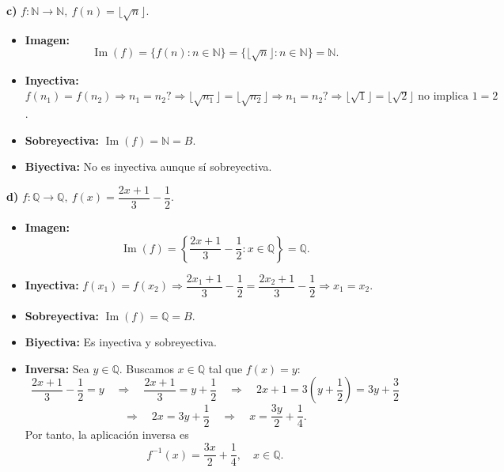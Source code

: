 \documentclass[a4paper,12pt]{article}
\begin{document}
\begin{ejercicio}[title=Ejercicio 19]

\textbf{c) } $f:\mathbb{N}\to\mathbb{N},\ f(n)=\lfloor \sqrt{n} \rfloor$.

\begin{itemize}
  \item \textbf{Imagen:} 
  \[
    \operatorname{Im}(f) = \{f(n) : n \in \mathbb{N}\} = \{\lfloor \sqrt{n} \rfloor : n \in \mathbb{N}\} = \boxed{\mathbb{N}}.
  \]
  \item \textbf{Inyectiva:} $f(n_1) = f(n_2) \Rightarrow n_1 = n_2? \Rightarrow \lfloor \sqrt{n_1} \rfloor = \lfloor \sqrt{n_2} \rfloor \Rightarrow n_1 = n_2? \Rightarrow \lfloor \sqrt{1} \rfloor = \lfloor \sqrt{2} \rfloor \text{ no implica } 1 = 2$. 
  \item \textbf{Sobreyectiva:} $\operatorname{Im}(f) = \mathbb{N} = B$. 
  \item \textbf{Biyectiva:} No es inyectiva aunque sí sobreyectiva. 
\end{itemize}

\textbf{d) } $f:\mathbb{Q}\to\mathbb{Q},\ f(x)=\dfrac{2x+1}{3}-\dfrac{1}{2}$.

\begin{itemize}
  \item \textbf{Imagen:} 
  \[
    \operatorname{Im}(f) = \left\{ \frac{2x+1}{3} - \frac{1}{2} : x \in \mathbb{Q} \right\} = \boxed{\mathbb{Q}}.
  \]
  \item \textbf{Inyectiva:} $f(x_1) = f(x_2) \Rightarrow \dfrac{2x_1+1}{3} - \dfrac{1}{2} = \dfrac{2x_2+1}{3} - \dfrac{1}{2} \Rightarrow x_1 = x_2$. 
  \item \textbf{Sobreyectiva:} $\operatorname{Im}(f) = \mathbb{Q} = B$. 
  \item \textbf{Biyectiva:} Es inyectiva y sobreyectiva. 
  \item \textbf{Inversa:}  
Sea $y \in \mathbb{Q}$. Buscamos $x \in \mathbb{Q}$ tal que $f(x) = y$:  
\[
\frac{2x+1}{3} - \frac{1}{2} = y \quad \Rightarrow \quad \frac{2x+1}{3} = y + \frac{1}{2} \quad \Rightarrow \quad 2x+1 = 3\left(y + \frac{1}{2}\right) = 3y + \frac{3}{2} \]
\[\Rightarrow \quad 2x = 3y + \frac{1}{2} \quad \Rightarrow \quad x = \frac{3y}{2} + \frac{1}{4}.
\]  
Por tanto, la aplicación inversa es  
\[
\boxed{f^{-1}(x) = \frac{3x}{2} + \frac{1}{4}, \quad x \in \mathbb{Q}}.
\]
\end{itemize}


\end{ejercicio}
\end{document}
